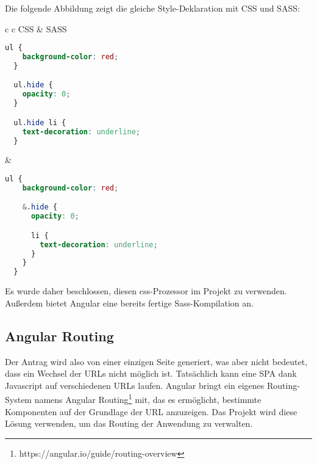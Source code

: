 Die folgende Abbildung zeigt die gleiche Style-Deklaration mit CSS und SASS:

\begin{table}[H]
  \begin{tabular}{c c}
    CSS & SASS \\
    \begin{lstlisting}[language=css,caption={Beispiel für die Gestaltung einer Liste mit css}]
  ul {
    background-color: red;
  }

  ul.hide {
    opacity: 0;
  }

  ul.hide li {
    text-decoration: underline;
  }
      \end{lstlisting}
        &
    \begin{lstlisting}[language=css,caption={Beispiel für die Gestaltung einer Liste mit scss}]
  ul {
    background-color: red;

    &.hide {
      opacity: 0;

      li {
        text-decoration: underline;
      }
    }
  }
            \end{lstlisting}
  \end{tabular}
  \caption{Beispiel für die Deklaration von Styles in CSS und SASS }
\end{table}

Es wurde daher beschlossen, diesen css-Prozessor im Projekt zu verwenden. Außerdem bietet Angular eine bereits fertige Sass-Kompilation an.

\subsection{Angular Routing}

Der Antrag wird also von einer einzigen Seite generiert, was aber nicht bedeutet, dass ein Wechsel der URLs nicht möglich ist.
Tatsächlich kann eine SPA dank Javascript auf verschiedenen URLs laufen.
Angular bringt ein eigenes Routing-System namens Angular Routing\footnote{https://angular.io/guide/routing-overview} mit, das es ermöglicht, bestimmte Komponenten auf der Grundlage der URL anzuzeigen. Das Projekt wird diese Lösung verwenden, um das Routing der Anwendung zu verwalten.

